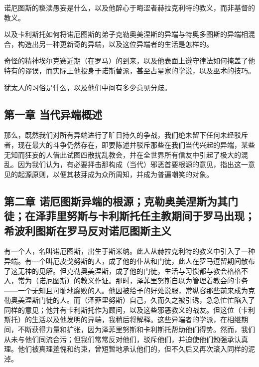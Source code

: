 诺厄图斯的亵渎愚妄是什么，以及他醉心于晦涩者赫拉克利特的教义，而非基督的教义。\par

以及卡利斯托如何将诺厄图斯的弟子克勒奥美涅斯的异端与特奥多图斯的异端相混合，构造出另一种更新奇的异端，以及这位异端者的生活是怎样的。\par

奇怪的精神埃尔克赛近期（在罗马）的到来，以及他表面上遵守律法如何掩盖了他特有的谬误，而实际上他投身于诺斯替派，甚至占星家的学说，以及巫术的技巧。\par

犹太人的习俗是什么，以及他们中间有多少意见分歧。\par


\subsection{第一章 当代异端概述}

那么，既然我们对所有异端进行了旷日持久的争战，我们绝未留下任何未经驳斥者，现在最大的斗争仍然存在，即要陈述并驳斥那些在我们当代兴起的异端，某些无知而狂妄的人借此试图四散扰乱教会，并在全世界所有信友中引起了极大的混乱。因为我们认为，有必要抨击那构成（当代）邪恶首要根源的意见，指出这一意见的起源原则，以便其枝芽成为众所周知，并成为普遍嘲笑的对象。\par


\subsection{第二章 诺厄图斯异端的根源；克勒奥美涅斯为其门徒；在泽菲里努斯与卡利斯托任主教期间于罗马出现；希波利图斯在罗马反对诺厄图斯主义}

有一个人，名叫诺厄图斯，出生于斯米纳。此人从赫拉克利特的教义中引入了一种异端。有一个叫厄皮戈努斯的人，成了他的仆从和门徒，此人在罗马逗留期间散布了这无神的见解。但克勒奥美涅斯，成了他的门徒，生活与习惯都与教会格格不入，常为（诺厄图斯）的教义作证。那时，泽菲里努斯自以为管理着教会的事务——一个无知且可耻地腐败的人。他因被给予的好处说服，常纵容那些前来成为克勒奥美涅斯门徒的人。而（泽菲里努斯）自己，久而久之被引诱，急急忙忙陷入了同样的意见；他并有卡利斯托作为顾问，以及这些邪恶教义的战友。但这位（卡利斯托）的生活以及他发明的异端，我稍后将解释。这些异端者的学派，在相继期间，不断获得力量和扩张，因为泽菲里努斯和卡利斯托帮助他们得势。然而，我们从未与他们同流合污；但我们常常反对他们，驳斥他们，并迫使他们勉强承认真理。他们被真理羞愧和约束，曾短暂地承认他们的，但不久后又再次滚入同样的泥淖。\par

